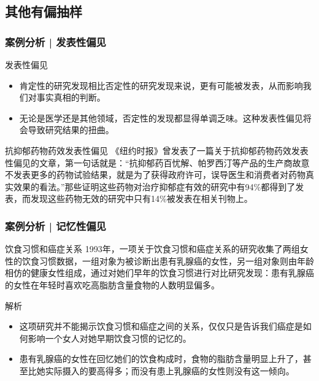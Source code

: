 \subsection{其他有偏抽样}
\begin{frame}
  \frametitle{案例分析 | 发表性偏见}
  \begin{block}{发表性偏见}
    \begin{itemize}
      \item 肯定性的研究发现相比否定性的研究发现来说，更有可能被发表，从而影响我们对事实真相的判断。
      \item 无论是医学还是其他领域，否定性的发现都显得单调乏味。这种发表性偏见将会导致研究结果的扭曲。
    \end{itemize}
  \end{block}
  \pause
  \begin{block}{抗抑郁药物药效发表性偏见}
    《纽约时报》曾发表了一篇关于抗抑郁药物药效发表性偏见的文章，第一句话就是：“抗抑郁药百忧解、帕罗西汀等产品的生产商故意不发表更多的药物试验结果，就是为了获得政府许可，误导医生和消费者对药物真实效果的看法。”那些证明这些药物对治疗抑郁症有效的研究中有94\%都得到了发表，而发现这些药物无效的研究中只有14\%被发表在相关刊物上。
  \end{block}
\end{frame}

\begin{frame}
  \frametitle{案例分析 | 记忆性偏见}
  \begin{block}{饮食习惯和癌症关系}
    1993年，一项关于饮食习惯和癌症关系的研究收集了两组女性的饮食习惯数据，一组对象为被诊断出患有乳腺癌的女性，另一组对象则由年龄相仿的健康女性组成，通过对她们早年的饮食习惯进行对比研究发现：患有乳腺癌的女性在年轻时喜欢吃高脂肪含量食物的人数明显偏多。
  \end{block}
  \pause \pause \pause \pause
  \begin{block}{解析}
    \begin{itemize}
      \item 这项研究并不能揭示饮食习惯和癌症之间的关系，仅仅只是告诉我们癌症是如何影响一个女人对她早期饮食习惯的记忆的。
      \item 患有乳腺癌的女性在回忆她们的饮食构成时，食物的脂肪含量明显上升了，甚至比她实际摄入的要高得多；而没有患上乳腺癌的女性则没有这一倾向。
    \end{itemize}
  \end{block}
\end{frame}

